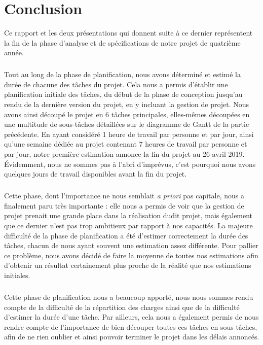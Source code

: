 \chapter{Conclusion}

Ce rapport et les deux présentations qui donnent suite à ce dernier représentent la fin
de la phase d’analyse et de spécifications de notre projet de quatrième année.

\paragraph{}

Tout au long de la phase de planification, nous avons déterminé et estimé la durée de chacune des tâches du projet. Cela nous a permis d’établir une planification initiale des tâches, du début de la phase de conception jusqu’au rendu de la dernière version du projet, en y incluant la gestion de projet. Nous avons ainsi découpé le projet en 6 tâches principales, elles-mêmes découpées en une multitude de sous-tâches détaillées sur le diagramme de Gantt de la partie précédente. En ayant considéré 1 heure de travail par personne et par jour, ainsi qu’une semaine dédiée au projet contenant 7 heures de travail par personne et par jour, notre première estimation annonce la fin du projet au 26 avril 2019. Évidemment, nous ne sommes pas à l’abri d’imprévus, c’est pourquoi nous avons quelques jours de travail disponibles avant la fin du projet.

\paragraph{}

Cette phase, dont l’importance ne nous semblait \textit{a priori} pas capitale, nous a finalement paru très importante : elle nous a permis de voir que la gestion de projet prenait une grande place dans la réalisation dudit projet, mais également que ce dernier n’est pas trop ambitieux par rapport à nos capacités. La majeure difficulté de la phase de planification a été d’estimer correctement la durée des tâches, chacun de nous ayant souvent une estimation assez différente. Pour pallier ce problème, nous avons décidé de faire la moyenne de toutes nos estimations afin d’obtenir un résultat certainement plus proche de la réalité que nos estimations initiales.

\paragraph{}

Cette phase de planification nous a beaucoup apporté, nous nous sommes rendu compte de la difficulté de la répartition des charges ainsi que de la difficulté d’estimer la durée d’une tâche. Par ailleurs, cela nous a également permis de nous rendre compte de l’importance de bien découper toutes ces tâches en sous-tâches, afin de ne rien oublier et ainsi pouvoir terminer le projet dans les délais annoncés.
